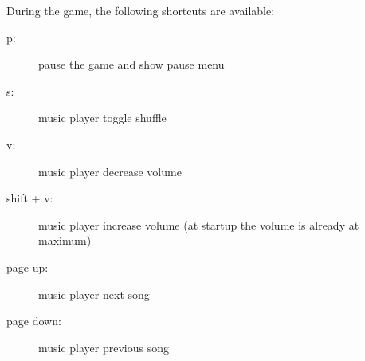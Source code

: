 During the game, the following shortcuts are available:

  \begin{description}
    \item[p:] pause the game and show pause menu
    \item[s:] music player toggle shuffle
    \item[v:] music player decrease volume
    \item[shift + v:] music player increase volume (at startup the volume is already at maximum)
    \item[page up:] music player next song
    \item[page down:] music player previous song
  \end{description}
